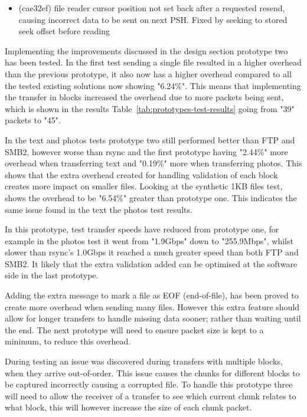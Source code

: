 \begin{itemize}
    \item (cae32ef) file reader cursor position not set back after a requested resend, causing incorrect data to be sent on next PSH. Fixed by seeking to stored seek offset before reading
\end{itemize}

Implementing the improvements discussed in the design section prototype two has been tested. In the first test sending a single file resulted in a higher overhead than the previous prototype, it also now has a higher overhead compared to all the tested existing solutions now showing "6.24\%". This means that implementing the transfer in blocks increased the overhead due to more packets being sent, which is shown in the results Table~\ref{tab:prototypes-test-results} going from "39" packets to "45".

In the text and photos tests prototype two still performed better than FTP and SMB2, however worse than rsync and the first prototype having "2.44\%" more overhead when transferring text and "0.19\%" more when transferring photos. This shows that the extra overhead created for handling validation of each block creates more impact on smaller files. Looking at the synthetic 1KB files test, shows the overhead to be "6.54\%" greater than prototype one. This indicates the same issue found in the text the photos test results.

In this prototype, test transfer speeds have reduced from prototype one, for example in the photos test it went from "1.9Gbps" down to "255.9Mbps", whilst slower than rsync's 1.0Gbps it reached a much greater speed than both FTP and SMB2. It likely that the extra validation added can be optimised at the software side in the last prototype.

Adding the extra message to mark a file as EOF (end-of-file), has been proved to create more overhead when sending many files. However this extra feature should allow for longer transfers to handle missing data sooner; rather than waiting until the end. The next prototype will need to ensure packet size is kept to a minimum, to reduce this overhead.

During testing an issue was discovered during transfers with multiple blocks, when they arrive out-of-order. This issue causes the chunks for different blocks to be captured incorrectly causing a corrupted file. To handle this prototype three will need to allow the receiver of a transfer to see which current chunk relates to what block, this will however increase the size of each chunk packet.

